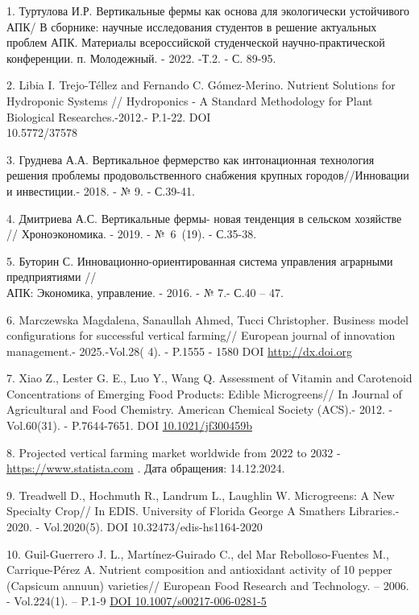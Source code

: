 \begin{references}
1. Туртулова И.Р. Вертикальные фермы как основа для экологически
устойчивого АПК\textsc{/ В} сборнике: научные исследования студентов в
решение актуальных проблем АПК. Материалы всероссийской студенческой
научно-практической конференции. п. Молодежный. - 2022. -Т.2. - С.
89-95.

2. Libia I. Trejo-Téllez and Fernando C. Gómez-Merino. Nutrient Solutions
for Hydroponic Systems // Hydroponics - A Standard Methodology for Plant
Biological Researches.-2012.- P.1-22. DOI \\10.5772/37578

3. Груднева А.А. Вертикальное фермерство как интонационная технология
решения проблемы продовольственного снабжения крупных городов//Инновации
и инвестиции.- 2018. - № 9. - С.39-41.

4. Дмитриева А.С. Вертикальные фермы- новая тенденция в сельском
хозяйстве // Хроноэкономика. - 2019. - №~6~(19). - С.35-38.

5. Буторин С. Инновационно-ориентированная система управления аграрными
предприятиями // \\АПК: Экономика, управление. - 2016. - № 7.- С.40 -- 47.

6. Marczewska Magdalena, Sanaullah Ahmed, Tucci Christopher. Business
model configurations for suc\-cessful vertical farming// European journal
of innovation management.- 2025.-Vol.28( 4). - P.1555 - 1580 DOI
\href{http://dx.doi.org/10.1108/EJIM-01-2023-0017}{http://dx.doi.org}

7. Xiao Z., Lester G. E., Luo Y., Wang Q. Assessment of Vitamin and
Carotenoid Concentrations of Emerging Food Products: Edible
Microgreens// In Journal of Agricultural and Food Chemistry. American
Chemical Society (ACS).- 2012. -Vol.60(31). - P.7644-7651. DOI
\href{https://doi.org/10.1021/jf300459b}{10.1021/jf300459b}

8. Projected vertical farming market worldwide from 2022 to 2032 -
\href{https://www.statista.com/statistics/487666/projection-vertical-farming-market-worldwide/}{https://www.statista.com}
. Дата обращения: 14.12.2024.

9. Treadwell D., Hochmuth R., Landrum L., Laughlin W. Microgreens: A New
Specialty Crop// In EDIS. University of Florida George A Smathers
Libraries.- 2020. - Vol.2020(5). DOI 10.32473/edis-hs1164-2020

10. Guil-Guerrero J. L., Martínez-Guirado C., del Mar Rebolloso-Fuentes
M., Carrique-Pérez A. Nutrient composition and antioxidant activity of
10 pepper (Capsicum annuun) varieties// European Food Research and
Technology. -- 2006. - Vol.224(1). -- P.1-9
\href{https://doi.org/10.1007/s00217-006-0281-5}{DOI
10.1007/s00217-006-0281-5}


\end{references}
